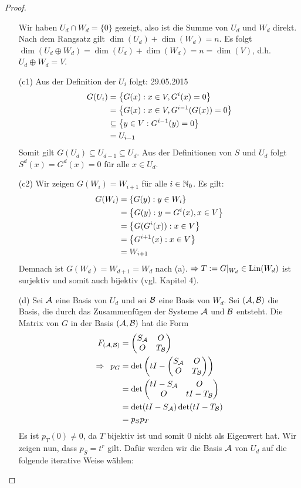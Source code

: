 \begin{proof}
\begin{itemize}
		Wir haben $ U_d \cap W_d = \{0\} $ gezeigt, also ist die Summe von $ U_d $ und $ W_d $ direkt. Nach dem Rangsatz gilt $ \dim(U_d) + \dim(W_d) = n $. Es folgt $ \dim(U_d \oplus W_d) = \dim(U_d) + \dim(W_d) = n = \dim(V) $, d.h. $ U_d \oplus W_d = V $.
		\item[(c1)]
		Aus der Definition der $ U_i $ folgt: \hfill 29.05.2015
		\begin{align}
			G(U_i) &= \left\{ G(x) : x \in V, G^i(x)=0 \right\} \nonumber \\
			&= \left\{ G(x) : x \in V, G^{i-1}(G(x)) = 0 \right\} \nonumber \\
			&\subseteq \left\{ y \in V : G^{i-1}(y) = 0 \right\} \nonumber \\
			&= U_{i-1}
			\label{eq:6_4_4:ast}
		\end{align}
		Somit gilt $ G(U_d) \subseteq U_{d-1} \subseteq U_d $. Aus der Definitionen von $ S $ und $ U_d $ folgt $ S^d(x) = G^d(x) = 0 $ für alle $ x \in U_d $.
		\item[(c2)]
		Wir zeigen $ G(W_i) = W_{i+1} $ für alle $ i \in \mathbb N_0 $. Es gilt:
		\begin{align}
			G(W_i) &= \left\{ G(y) : y \in W_i \right\} \nonumber \\
			&= \left\{ G(y) : y = G^i(x), x \in V \right\} \nonumber \\
			&= \left\{ G(G^i(x)) : x \in V \right\} \nonumber \\
			&= \left\{ G^{i+1}(x) : x \in V \right\} \nonumber \\
			&= W_{i+1}
			\label{eq:6_4_4:astast}
		\end{align}
		Demnach ist $ G(W_d) = W_{d+1} = W_d $ nach (a). $ \Rightarrow T := G|_{W_d} \in \operatorname{Lin}(W_d) $ ist surjektiv und somit auch bijektiv (vgl. Kapitel 4).
		\item[(d)]
		Sei $ \mathcal{A} $ eine Basis von $ U_d $ und sei $ \mathcal{B} $ eine Basis von $ W_d $. Sei $ (\mathcal{A},\mathcal{B}) $ die Basis, die durch das Zusammenfügen der Systeme $ \mathcal{A} $ und $ \mathcal{B} $ entsteht. Die Matrix von $ G $ in der Basis $ (\mathcal{A},\mathcal{B}) $ hat die Form
		\begin{align*}
			F_{(\mathcal{A},\mathcal{B})} &= \begin{pmatrix}
				S_{\mathcal{A}} & O \\
				O & T_{\mathcal{B}}
			\end{pmatrix} \\
			\Rightarrow \enspace p_G &= \det\left( tI - \begin{pmatrix}
				S_{\mathcal{A}} & O \\
				O & T_{\mathcal{B}}
			\end{pmatrix} \right) \\
			&= \det\begin{pmatrix}
				tI - S_{\mathcal{A}} & O \\
				O & tI - T_{\mathcal{B}}
			\end{pmatrix} \\
			&= \det(tI - S_{\mathcal{A}}) \det(tI - T_{\mathcal{B}}) \\
			&= p_S p_T
		\end{align*}
		Es ist $ p_T(0) \neq 0 $, da $ T $ bijektiv ist und somit 0 nicht als Eigenwert hat. Wir zeigen nun, dass $ p_S = t^r $ gilt. Dafür werden wir die Basis $ \mathcal{A} $ von $ U_d $ auf die folgende iterative Weise wählen:
		

\end{itemize}
\end{proof}

